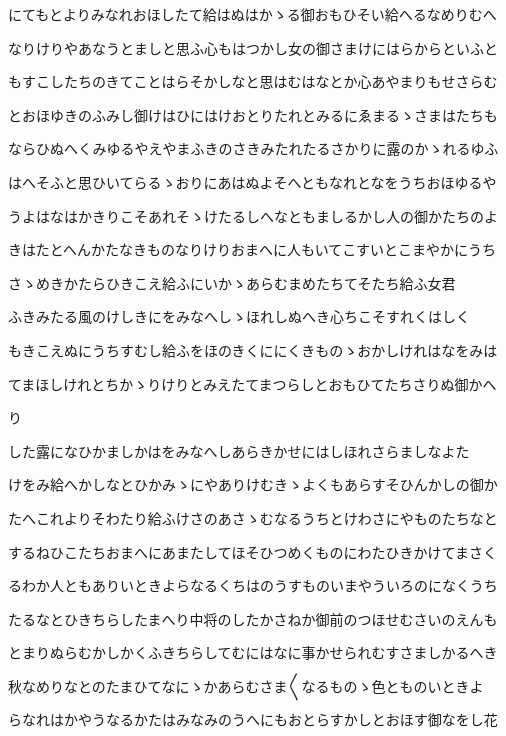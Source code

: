 \documentclass[a4paper,11pt,landscape]{ltjtarticle}
\begin{document}
にてもとよりみなれおほしたて給はぬはかゝる御おもひそい給へるなめりむへ
\par\medskip
なりけりやあなうとましと思ふ心もはつかし女の御さまけにはらからといふと
\par\medskip
もすこしたちのきてことはらそかしなと思はむはなとか心あやまりもせさらむ
\par\medskip
とおほゆきのふみし御けはひにはけおとりたれとみるにゑまるゝさまはたちも
\par\medskip
ならひぬへくみゆるやえやまふきのさきみたれたるさかりに露のかゝれるゆふ
\par\medskip
はへそふと思ひいてらるゝおりにあはぬよそへともなれとなをうちおほゆるや
\par\medskip
うよはなはかきりこそあれそゝけたるしへなともましるかし人の御かたちのよ
\par\medskip
きはたとへんかたなきものなりけりおまへに人もいてこすいとこまやかにうち
\par\medskip
さゝめきかたらひきこえ給ふにいかゝあらむまめたちてそたち給ふ女君
\par\medskip
ふきみたる風のけしきにをみなへしゝほれしぬへき心ちこそすれくはしく
\par\medskip
もきこえぬにうちすむし給ふをほのきくににくきものゝおかしけれはなをみは
\par\medskip
てまほしけれとちかゝりけりとみえたてまつらしとおもひてたちさりぬ御かへ
\par\medskip
り
\par\medskip
した露になひかましかはをみなへしあらきかせにはしほれさらましなよた
\par\medskip
けをみ給へかしなとひかみゝにやありけむきゝよくもあらすそひんかしの御か
\par\medskip
たへこれよりそわたり給ふけさのあさゝむなるうちとけわさにやものたちなと
\par\medskip
するねひこたちおまへにあまたしてほそひつめくものにわたひきかけてまさく
\par\medskip
るわか人ともありいときよらなるくちはのうすものいまやういろのになくうち
\par\medskip
たるなとひきちらしたまへり中将のしたかさねか御前のつほせむさいのえんも
\par\medskip
とまりぬらむかしかくふきちらしてむにはなに事かせられむすさましかるへき
\par\medskip
秋なめりなとのたまひてなにゝかあらむさま〱なるものゝ色とものいときよ
\par\medskip
らなれはかやうなるかたはみなみのうへにもおとらすかしとおほす御なをし花
\par\medskip
\end{document}
